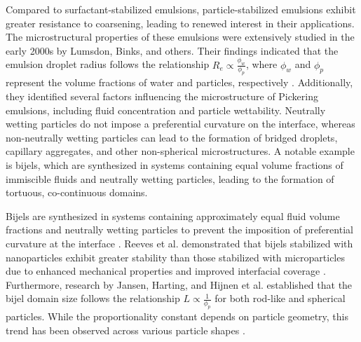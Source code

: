 Compared to surfactant-stabilized emulsions, particle-stabilized emulsions exhibit greater resistance to coarsening, leading to renewed interest in their applications. 
The microstructural properties of these emulsions were extensively studied in the early 2000s by Lumsdon, Binks, and others. Their findings indicated that the emulsion 
droplet radius follows the relationship $R_e \propto \frac{\phi_w}{\phi_p}$, where $\phi_w$ and $\phi_p$ represent the volume fractions of water and particles, 
respectively \cite{binks_pickering_2001}. Additionally, they identified several factors influencing the microstructure of Pickering emulsions, including fluid concentration 
and particle wettability. Neutrally wetting particles do not impose a preferential curvature on the interface, whereas non-neutrally wetting particles can lead to the 
formation of bridged droplets, capillary aggregates, and other non-spherical microstructures. A notable example is bijels, which are synthesized in systems containing equal 
volume fractions of immiscible fluids and neutrally wetting particles, leading to the formation of tortuous, co-continuous domains.

Bijels are synthesized in systems containing approximately equal fluid volume fractions and neutrally wetting particles to prevent the imposition of preferential 
curvature at the interface \cite{stratford_colloidal_2005, herzig_bicontinuous_2007, lee_bicontinuous_2010, jansen_bijels_2011, velankar_non-equilibrium_2015}. 
Reeves et al. demonstrated that bijels stabilized with nanoparticles exhibit greater stability than those stabilized with microparticles due to enhanced mechanical 
properties and improved interfacial coverage \cite{reeves_particle-size_2015}. 
Furthermore, research by Jansen, Harting, and Hijnen et al. established that the bijel domain size follows the relationship $ L \propto \frac{1}{\phi_p} $ for both 
rod-like and spherical particles. While the proportionality constant depends on particle geometry, this trend has been observed across various particle shapes 
\cite{hijnen_bijels_2015, madivala_exploiting_2009, gunther_timescales_2014, daware_emulsions_2015, loudet_capillary_2005, cheng_shape-anisotropic_2013}.


